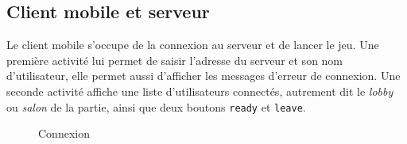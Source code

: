 \subsection{Client mobile et serveur}
Le client mobile s'occupe de la connexion au serveur et de lancer le jeu.
Une première activité lui permet de saisir l'adresse du serveur et son nom d'utilisateur, elle permet aussi d'afficher les messages d'erreur de connexion. Une seconde activité affiche une liste d'utilisateurs connectés, autrement dit le \textit{lobby} ou \textit{salon} de la partie, ainsi que deux boutons \verb!ready! et \verb!leave!.

\begin{figure}
\begin{center}
\end{center}
\caption{Connexion}
\end{figure}

